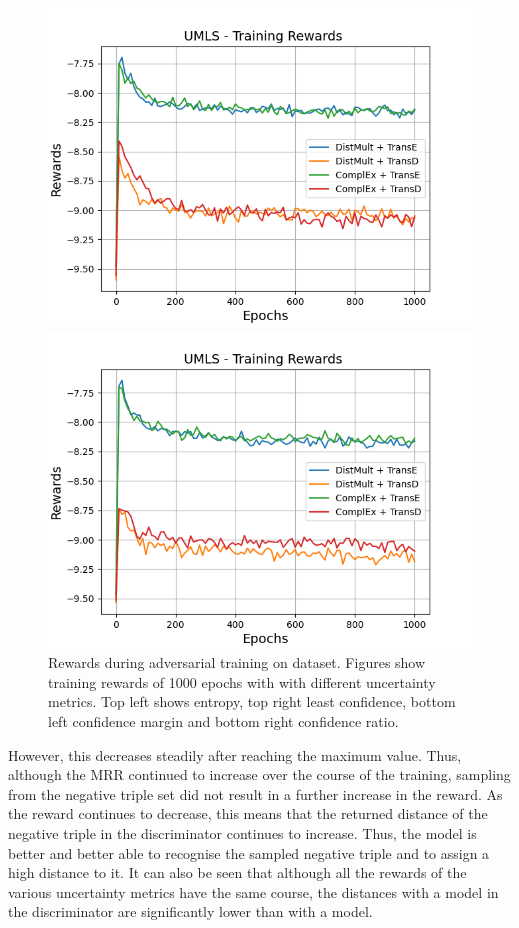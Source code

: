 \begin{figure}
\begin{minipage}{.5\textwidth}
      \centering
      \includegraphics[width=0.9\linewidth]{figures/results/gan_train/not_pretrained/uncertainty/max_distribution/confidence_margin/umls/uncertainty_umls_rew.png}
    \end{minipage}%
    \begin{minipage}{.5\textwidth}
      \centering
      \includegraphics[width=0.9\linewidth]{figures/results/gan_train/not_pretrained/uncertainty/max_distribution/confidence_ratio/umls/uncertainty_umls_rew.png}
    \end{minipage}%
    \caption{Rewards during adversarial training on \umls dataset. 
    Figures show training rewards of 1000 epochs with \ussoftmax with different uncertainty metrics.
    Top left shows entropy, top right least confidence, 
    bottom left confidence margin and bottom right confidence ratio.}
    \label{fig:advtrain_metrics_umls_rew}
\end{figure}
However, this decreases steadily after reaching the maximum value.
Thus, although the MRR continued to increase over the course of the training, sampling from the negative triple set did not result in a further increase in the reward.
As the reward continues to decrease, this means that the returned distance of the negative triple in the discriminator continues to increase.
Thus, the model is better and better able to recognise the sampled negative triple and to assign a high distance to it.
It can also be seen that although all the rewards of the various uncertainty metrics have the same course, the distances with a \transd model in the discriminator are significantly lower than with a \transe model.
